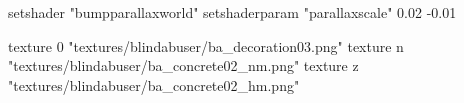 	setshader "bumpparallaxworld"
	setshaderparam "parallaxscale" 0.02 -0.01

		texture 0 "textures/blindabuser/ba_decoration03.png"
		texture n "textures/blindabuser/ba_concrete02_nm.png"
		texture z "textures/blindabuser/ba_concrete02_hm.png"
